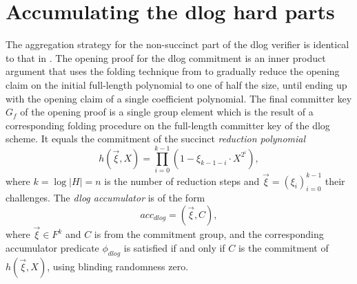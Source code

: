 \documentclass[10pt,article,oneside]{memoir}
\theoremstyle{definition}
\theoremstyle{remark}
\begin{document}



\section{Accumulating the dlog hard parts}
\label{s:IPAAggregation}

The aggregation strategy for the non-succinct part of the dlog verifier is identical to that in \cite{Buenz}.
The opening proof for the dlog commitment is an inner product argument that uses the folding technique from \cite{BootleGroth} to gradually reduce the opening claim on the initial full-length polynomial to one of half the size, until ending up with the opening claim of a single coefficient polynomial. 
The final committer key $G_{f}$ of the opening proof is a single group element which is the result of a corresponding folding procedure on the full-length committer key of the dlog scheme.
It equals the commitment of the succinct \textit{reduction polynomial}
\begin{equation}
\label{e:BulletPolynomial}
h(\vec\xi, X) = \prod_{i=0}^{k-1} ( 1- \xi_{k-1-i} \cdot X^{2^i}),
\end{equation}
where $k=\log|H|=n$ is the number of reduction steps and $\vec\xi = (\xi_i)_{i=0}^{k-1}$ their challenges.
The \textit{dlog accumulator} is of the form
\[
acc_{dlog} = (\vec\xi, C),
\]
where $\vec\xi\in F^k$ and $C$ is from the commitment group, and the corresponding accumulator predicate $\phi_{dlog}$ is satisfied if and only if $C$ is the commitment of $h(\vec\xi, X)$, using blinding randomness zero.
\end{document}
